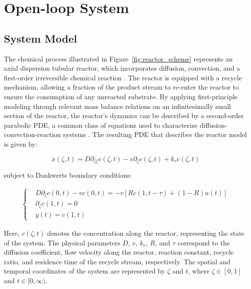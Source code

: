 \section{Open-loop System}

\subsection{System Model}

The chemical process illustrated in Figure~\ref{fig:reactor_scheme} represents an axial dispersion tubular reactor, which incorporates diffusion, convection, and a first-order irreversible chemical reaction \autocite{levenspiel1998chemical}. The reactor is equipped with a recycle mechanism, allowing a fraction of the product stream to re-enter the reactor to ensure the consumption of any unreacted substrate. By applying first-principle modeling through relevant mass balance relations on an infinitesimally small section of the reactor, the reactor's dynamics can be described by a second-order parabolic PDE, a common class of equations used to characterize diffusion-convection-reaction systems \autocite{jensen1982bifurcation}. The resulting PDE that describes the reactor model is given by:

\begin{equation} \label{eq:PDE_original_model}
    \dot{x}(\zeta, t) = D \partial_{\zeta \zeta} c(\zeta, t) - v \partial_\zeta c(\zeta, t) + k_r c(\zeta, t)
\end{equation}

subject to Dankwerts boundary conditions:

\begin{align} \label{eq:BC}
    \begin{cases}
        &D \partial_\zeta c(0, t) - v c(0, t) = -v \left[ R c(1, t-\tau) + (1-R) u(t) \right] \\
        &\partial_\zeta c(1, t) = 0 \\
        &y(t) = c(1, t)
    \end{cases}
\end{align}

Here, $c(\zeta, t)$ denotes the concentration along the reactor, representing the state of the system. The physical parameters $D$, $v$, $k_r$, $R$, and $\tau$ correspond to the diffusion coefficient, flow velocity along the reactor, reaction constant, recycle ratio, and residence time of the recycle stream, respectively. The spatial and temporal coordinates of the system are represented by $\zeta$ and $t$, where $\zeta \in [0, 1]$ and $t \in [0, \infty)$.

